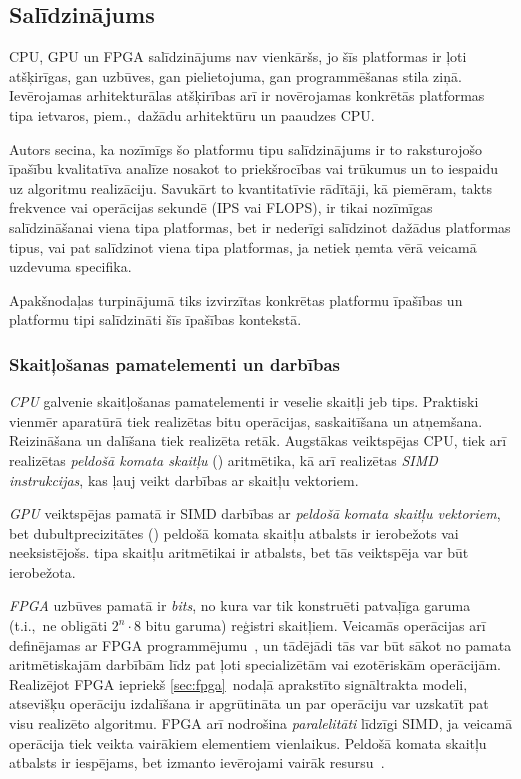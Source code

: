 \subsection{Salīdzinājums} \label{sec:proc-cmp}
CPU, GPU un FPGA salīdzinājums nav vienkāršs, jo šīs platformas ir ļoti
atšķirīgas, gan uzbūves, gan pielietojuma, gan programmēšanas stila ziņā.
Ievērojamas arhitekturālas atšķirības arī ir novērojamas konkrētās
platformas tipa ietvaros, piem.,~dažādu arhitektūru un paaudzes CPU.

Autors secina, ka nozīmīgs šo platformu tipu salīdzinājums ir to
raksturojošo īpašību kvalitatīva analīze nosakot to priekšrocības vai
trūkumus un to iespaidu uz algoritmu realizāciju. Savukārt to
kvantitatīvie rādītāji, kā piemēram, takts frekvence vai operācijas sekundē
(IPS vai FLOPS), ir tikai nozīmīgas salīdzināšanai viena tipa platformas,
bet ir nederīgi salīdzinot dažādus platformas tipus, vai pat salīdzinot viena tipa
platformas, ja netiek ņemta vērā veicamā uzdevuma specifika.

Apakšnodaļas turpinājumā tiks izvirzītas konkrētas platformu īpašības un
platformu tipi salīdzināti šīs īpašības kontekstā.

\subsubsection*{Skaitļošanas pamatelementi un darbības}
\emph{CPU} galvenie skaitļošanas pamatelementi ir veselie skaitļi jeb
 tips. Praktiski vienmēr aparatūrā tiek realizētas
bitu operācijas, saskaitīšana un atņemšana.
Reizināšana un dalīšana tiek realizēta retāk. Augstākas veiktspējas CPU,
tiek arī realizētas \emph{peldošā komata skaitļu} ()
aritmētika, kā arī realizētas \emph{SIMD instrukcijas},
kas ļauj veikt darbības ar skaitļu vektoriem.
\cite{Flynn-arch}\cite{Patterson}\cite{SIMD}

\emph{GPU} veiktspējas pamatā ir SIMD darbības ar \emph{peldošā komata
skaitļu vektoriem}, bet dubultprecizitātes ()
peldošā komata skaitļu atbalsts ir ierobežots vai neeksistējošs.
 tipa skaitļu aritmētikai ir atbalsts, bet tās veiktspēja
var būt ierobežota.
\cite{Fatahalian}\cite{Owens-GPU}

\emph{FPGA} uzbūves pamatā ir \emph{bits}, no kura var tik konstruēti
patvaļīga garuma (t.i.,~ne obligāti $2^n \cdot 8$ bitu garuma) reģistri
 skaitļiem. Veicamās operācijas arī definējamas ar FPGA
programmējumu~\cite{JIS}, un tādējādi tās var būt sākot no pamata aritmētiskajām darbībām
līdz pat ļoti specializētām vai ezotēriskām operācijām. Realizējot FPGA
iepriekš \ref{sec:fpga}~nodaļā aprakstīto signāltrakta modeli, atsevišķu
operāciju izdalīšana ir apgrūtināta un par operāciju var uzskatīt pat visu
realizēto algoritmu. FPGA arī nodrošina \emph{paralelitāti} līdzīgi SIMD, ja
veicamā operācija tiek veikta vairākiem elementiem vienlaikus.
Peldošā komata skaitļu atbalsts ir iespējams, bet izmanto ievērojami vairāk
resursu~\cite{FPGA-fp}.

